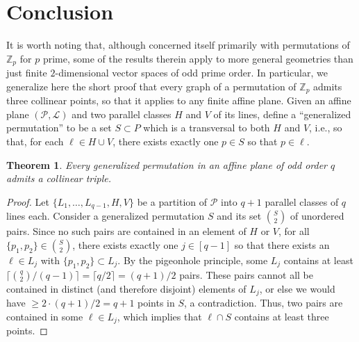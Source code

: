 \documentclass[12pt]{article}
\newtheorem{theorem}{Theorem}
\begin{document}
\section{Conclusion}

It is worth noting that, although \cite{cooper} concerned itself primarily with permutations of $\mathbb{Z}_p$ for $p$ prime, some of the results therein apply to more general geometries than just  finite $2$-dimensional vector spaces of odd prime order.  In particular, we generalize here the short proof that every graph of a permutation of $\mathbb{Z}_p$ admits three collinear points, so that it applies to any finite affine plane.  Given an affine plane $(\mathcal{P},\mathcal{L})$ and two parallel classes $H$ and $V$ of its lines, define a ``generalized permutation'' to be a set $S \subset P$ which is a transversal to both $H$ and $V$, i.e., so that, for each $\ell \in H \cup V$, there exists exactly one $p \in S$ so that $p \in \ell$.

\begin{theorem} \label{thm:oldthm}
    Every generalized permutation in an affine plane of odd order $q$ admits a collinear triple.
\end{theorem}
\begin{proof}
    Let $\{L_1,\ldots,L_{q-1},H,V\}$ be a partition of $\mathcal{P}$ into $q+1$ parallel classes of $q$ lines each.  Consider a generalized permutation $S$ and its set $\binom{S}{2}$ of unordered pairs. Since no such pairs are contained in an element of $H$ or $V$, for all $\{p_1,p_2\} \in \binom{S}{2}$, there exists exactly one $j \in [q-1]$ so that there exists an $\ell \in L_j$ with $\{p_1,p_2\} \subset L_j$.  By the pigeonhole principle, some $L_j$ contains at least $\lceil \binom{q}{2}/(q-1) \rceil= \lceil q/2 \rceil = (q+1)/2$ pairs.  These pairs cannot all be contained in distinct (and therefore disjoint) elements of $L_j$, or else we would have $\geq 2 \cdot (q+1)/2 = q+1$ points in $S$, a contradiction.  Thus, two pairs are contained in some $\ell \in L_j$, which implies that $\ell \cap S$ contains at least three points.
\end{proof}
\end{document}
